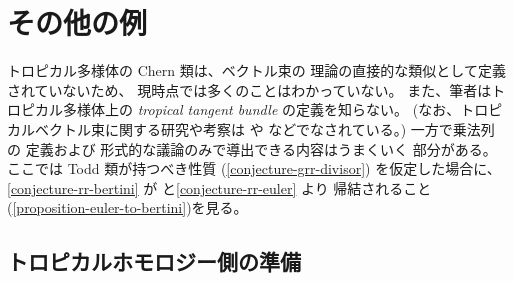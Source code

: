 \documentclass[a4paper,dvipdfmx,reqno,12pt]{amsart}
\theoremstyle{definition}
\numberwithin{equation}{section}
\begin{document}
\section{その他の例}
\cite{demedrano2023chern}
トロピカル多様体の Chern 類は、ベクトル束の
理論の直接的な類似として定義されていないため、
現時点では多くのことはわかっていない。
また、筆者はトロピカル多様体上の
\emph{tropical tangent bundle} の定義を知らない。
(なお、トロピカルベクトル束に関する研究や考察は
\cite{MR2961320,MR4646329}
や \cite[Theorem 1.8]{amini2020hodge}
などでなされている。)
一方で乗法列 \cite[]{MR1335917} の
定義および
形式的な議論のみで導出できる内容はうまくいく
部分がある。
ここでは Todd 類が持つべき性質
(\cref{conjecture-grr-divisor})
を仮定した場合に、
\cref{conjecture-rr-bertini} 
が\cite[Conjecture 6.13]{demedrano2023chern}
と\cref{conjecture-rr-euler} より
帰結されること
(\cref{proposition-euler-to-bertini})を見る。

\subsection{トロピカルホモロジー側の準備}
\end{document}
